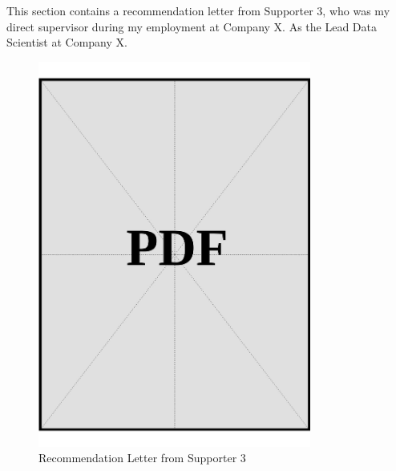 This section contains a recommendation letter from Supporter 3, who was my direct supervisor during my employment at Company X. As the Lead Data Scientist at Company X.

\begin{figure}[H]
    \centering
    \includegraphics[page=1, width=0.8\textwidth]{../docs/applicant/recommendation-letters/letter-3.pdf}
    \caption{Recommendation Letter from Supporter 3}
    \label{fig:recommendation-letter-3}
\end{figure}

\clearpage
